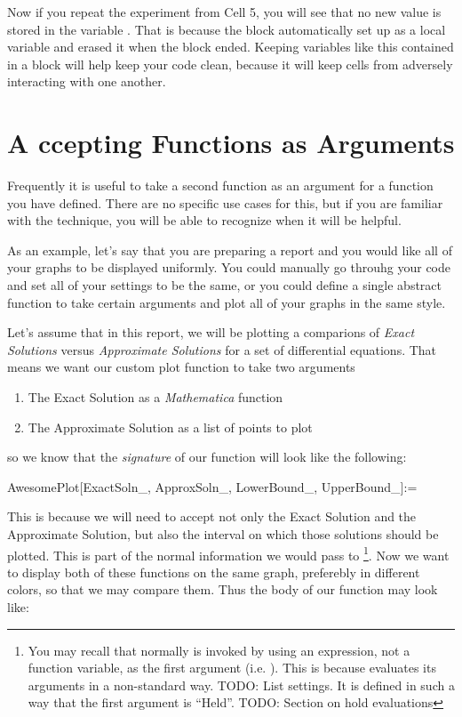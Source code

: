 Now if you repeat the experiment from Cell 5, you will see that no new value is stored in the variable . That is because the block automatically set  up as a local variable and erased it when the block ended. Keeping variables like this contained in a block will help keep your code clean, because it will keep cells from adversely interacting with one another. 

\section{A ccepting Functions as Arguments}

Frequently it is useful to take a second function as an argument for a function you have defined. There are no specific use cases for this, but if you are familiar with the technique, you will be able to recognize when it will be helpful.

As an example, let's say that you are preparing a report and you would like all of your graphs to be displayed uniformly. You could manually go throuhg your code and set all of your  settings to be the same, or you could define a single abstract function to take certain arguments and plot all of your graphs in the same style.

Let's assume that in this report, we will be plotting a comparions of \emph{Exact Solutions} versus \emph{Approximate Solutions} for a set of differential equations. That means we want our custom plot function to take two arguments
\begin{enumerate}
	   \item The Exact Solution as a \emph{Mathematica} function
	   \item The Approximate Solution as a list of points to plot
\end{enumerate}
so we know that the \emph{signature} of our function will look like the following:
\begin{code}
	   AwesomePlot[ExactSoln\_, ApproxSoln\_, LowerBound\_, UpperBound\_]:=
\end{code}

This is because we will need to accept not only the Exact Solution and the Approximate Solution, but also the interval on which those solutions should be plotted. This is part of the normal information we would pass to \footnote{You may recall that normally  is invoked by using an expression, not a function variable, as the first argument (i.e. ). This is because  evaluates its arguments in a non-standard way. TODO: List settings. It is defined in such a way that the first argument is ``Held''. TODO: Section on hold evaluations}. Now we want to display both of these functions on the same graph, preferebly in different colors, so that we may compare them. Thus the body of our function may look like:

